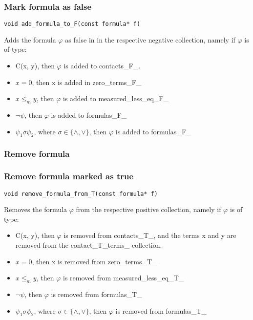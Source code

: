 \documentclass{article}
\begin{document}
			\subsubsection*{Mark formula as false}
				\begin{lstlisting}
void add_formula_to_F(const formula* f)
				\end{lstlisting}
				Adds the formula $\varphi$ as false in in the respective negative collection, namely
				if $\varphi$ is of type:
				\begin{itemize}
					\item C(x, y), then $\varphi$ is added to contacts\_F\_.
					\item $x = 0$, then x is added in zero\_terms\_F\_
					\item $x \le_m y$, then $\varphi$ is added to measured\_less\_eq\_F\_
					\item $\neg \psi$, then $\varphi$ is added to formulas\_F\_
					\item $\psi_1 \sigma \psi_2$, where $\sigma \in \{\wedge, \vee\}$, then $\varphi$ is added to formulas\_F\_
				\end{itemize}
			\subsubsection*{Remove formula}
			\subsubsection*{Remove formula marked as true}
				\begin{lstlisting}
void remove_formula_from_T(const formula* f)
				\end{lstlisting}
				Removes the formula $\varphi$ from the respective positive collection, namely
				if $\varphi$ is of type:
				\begin{itemize}
					\item C(x, y), then $\varphi$ is removed from contacts\_T\_, and the terms x and y are removed from the contact\_T\_terms\_ collection.
					\item $x = 0$, then x is removed from zero\_terms\_T\_
					\item $x \le_m y$, then $\varphi$ is removed from measured\_less\_eq\_T\_
					\item $\neg \psi$, then $\varphi$ is removed from formulas\_T\_
					\item $\psi_1 \sigma \psi_2$, where $\sigma \in \{\wedge, \vee\}$, then $\varphi$ is removed from formulas\_T\_
				\end{itemize}
\end{document}
